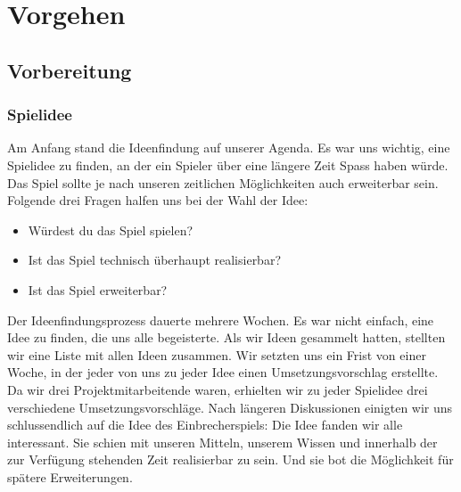 \documentclass[11pt,a4paper]{scrbook}
\begin{document}
\chapter{Vorgehen}
\section{Vorbereitung}
\subsection{Spielidee}
Am Anfang stand die Ideenfindung auf unserer Agenda. 
Es war uns wichtig, eine Spielidee zu finden, an der ein Spieler über eine längere Zeit Spass haben würde.
Das Spiel sollte je nach unseren zeitlichen Möglichkeiten auch erweiterbar sein.
Folgende drei Fragen halfen uns bei der Wahl der Idee:
\begin{itemize}
\item Würdest du das Spiel spielen?
\item Ist das Spiel technisch überhaupt realisierbar?
\item Ist das Spiel erweiterbar?
\end{itemize}
Der Ideenfindungsprozess dauerte mehrere Wochen. Es war nicht einfach, eine Idee zu finden, die uns alle begeisterte.
Als wir Ideen gesammelt hatten, stellten wir eine Liste mit allen Ideen zusammen.
Wir setzten uns ein Frist von einer Woche, in der jeder von uns zu jeder Idee einen Umsetzungsvorschlag erstellte.
Da wir drei Projektmitarbeitende waren, erhielten wir zu jeder Spielidee drei verschiedene Umsetzungsvorschläge.
Nach längeren Diskussionen einigten wir uns schlussendlich auf die Idee des Einbrecherspiels:
Die Idee fanden wir alle interessant. Sie schien mit unseren Mitteln, unserem Wissen und innerhalb der zur Verfügung stehenden Zeit realisierbar zu sein. Und sie bot die Möglichkeit für spätere Erweiterungen.
\end{document}
